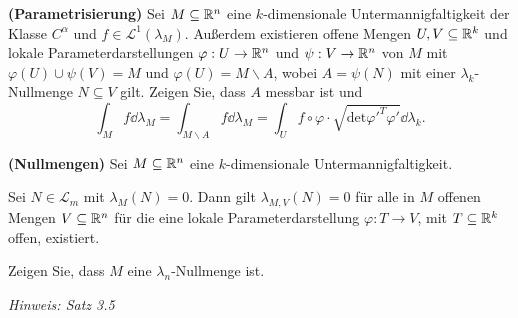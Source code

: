 \begin{Problem}
	\textbf{(Parametrisierung)} Sei $M\subseteq \mathbb{R}^n$ eine $k$-dimensionale Untermannigfaltigkeit der Klasse $C^\alpha$ und $f\in \mathcal{L}^1(\lambda_M)$. Außerdem existieren offene Mengen $U,V\subseteq \mathbb{R}^k$ und lokale Parameterdarstellungen $\varphi:U\to \mathbb{R}^n$ und $\psi:V\to\mathbb{R}^n$ von $M$ mit $\varphi(U)\cup \psi(V)=M$ und $\varphi(U)=M\backslash A$, wobei $A=\psi(N)$ mit einer $\lambda_k$-Nullmenge $N\subseteq V$ gilt. Zeigen Sie, dass $A$ messbar ist und
          \[
		\int_M f\dd{\lambda_M}=\int_{M\backslash A} f\dd{\lambda_M}=\int_U f\circ \varphi \cdot \sqrt{\text{det}\varphi'^T\varphi'} \dd{\lambda_k}
	.\] 
\end{Problem}

\begin{Problem}\label{pr:advanalblatt13-1}
	\textbf{(Nullmengen)} Sei $M\subseteq \mathbb{R}^n$ eine $k$-dimensionale Untermannigfaltigkeit.
	\begin{parts}
		\item Sei $N\in \mathcal{L}_m$ mit $\lambda_M(N)=0$. Dann gilt $\lambda_{M,V}(N)=0$ f\"{u}r alle in $M$ offenen Mengen $V\subseteq \mathbb{R}^n$ f\"{u}r die eine lokale Parameterdarstellung $\varphi:T\to V$, mit $T\subseteq \mathbb{R}^k$ offen, existiert.
		\item Zeigen Sie, dass $M$ eine $\lambda_n$-Nullmenge ist.
			
			{\footnotesize \emph{Hinweis: Satz 3.5}}
	\end{parts}
\end{Problem}
